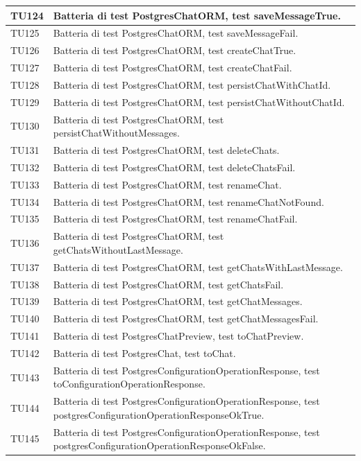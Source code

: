 \documentclass[10pt, a4paper]{article}
\begin{document}
\begin{xltabular}{\textwidth}{p{0.12\textwidth}|X}
\hline
TU124 & Batteria di test PostgresChatORM, test saveMessageTrue. \\
\hline
TU125 & Batteria di test PostgresChatORM, test saveMessageFail. \\
\hline
TU126 & Batteria di test PostgresChatORM, test createChatTrue. \\
\hline
TU127 & Batteria di test PostgresChatORM, test createChatFail. \\
\hline
TU128 & Batteria di test PostgresChatORM, test persistChatWithChatId. \\
\hline
TU129 & Batteria di test PostgresChatORM, test persistChatWithoutChatId. \\
\hline
TU130 & Batteria di test PostgresChatORM, test persistChatWithoutMessages. \\
\hline
TU131 & Batteria di test PostgresChatORM, test deleteChats. \\
\hline
TU132 & Batteria di test PostgresChatORM, test deleteChatsFail. \\
\hline
TU133 & Batteria di test PostgresChatORM, test renameChat. \\
\hline
TU134 & Batteria di test PostgresChatORM, test renameChatNotFound. \\
\hline
TU135 & Batteria di test PostgresChatORM, test renameChatFail. \\
\hline
TU136 & Batteria di test PostgresChatORM, test getChatsWithoutLastMessage. \\
\hline
TU137 & Batteria di test PostgresChatORM, test getChatsWithLastMessage. \\
\hline
TU138 & Batteria di test PostgresChatORM, test getChatsFail. \\
\hline
TU139 & Batteria di test PostgresChatORM, test getChatMessages. \\
\hline
TU140 & Batteria di test PostgresChatORM, test getChatMessagesFail. \\
\hline
TU141 & Batteria di test PostgresChatPreview, test toChatPreview. \\
\hline
TU142 & Batteria di test PostgresChat, test toChat. \\
\hline
TU143 & Batteria di test PostgresConfigurationOperationResponse, test toConfigurationOperationResponse. \\
\hline
TU144 & Batteria di test PostgresConfigurationOperationResponse, test postgresConfigurationOperationResponseOkTrue. \\
\hline
TU145 & Batteria di test PostgresConfigurationOperationResponse, test postgresConfigurationOperationResponseOkFalse. \\

\end{xltabular}
\end{document}
